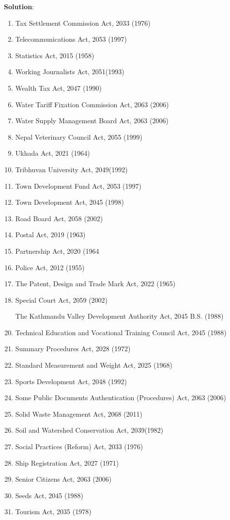 \documentclass[
  openany]{book}
\newenvironment{solution}{ {\bfseries Solution}:}{}
\begin{document}
\begin{questions}
\begin{solution}
\begin{enumerate}
\item Tax Settlement Commission Act, 2033 (1976)
\item Telecommunications Act, 2053 (1997)
\item Statistics Act, 2015 (1958)
\item Working Journalists Act, 2051(1993)
\item Wealth Tax Act, 2047 (1990)
\item Water Tariff Fixation Commission Act, 2063 (2006)
\item Water Supply Management Board Act, 2063 (2006)
\item Nepal Veterinary Council Act, 2055 (1999)
\item Ukhada Act, 2021 (1964)
\item Tribhuvan University Act, 2049(1992)
\item Town Development Fund Act, 2053 (1997)
\item Town Development Act, 2045 (1998)
\item Road Board Act, 2058 (2002)
\item Postal Act, 2019 (1963)
\item Partnership Act, 2020 (1964
\item Police Act, 2012 (1955)
\item The Patent, Design and Trade Mark Act, 2022 (1965)
\item Special Court Act, 2059 (2002)
\item [The] Kathmandu Valley Development Authority Act, 2045 B.S. (1988)
\item Technical Education and Vocational Training Council Act, 2045 (1988)
\item Summary Procedures Act, 2028 (1972)
\item Standard Measurement and Weight Act, 2025 (1968)
\item Sports Development Act, 2048 (1992)
\item Some Public Documents Authentication (Procedures) Act, 2063 (2006)
\item Solid Waste Management Act, 2068 (2011)
\item Soil and Watershed Conservation Act, 2039(1982)
\item Social Practices (Reform) Act, 2033 (1976)
\item Ship Registration Act, 2027 (1971)
\item Senior Citizens Act, 2063 (2006)
\item Seeds Act, 2045 (1988)
\item Tourism Act, 2035 (1978)

\end{enumerate}
\end{solution}
\end{questions}
\end{document}
